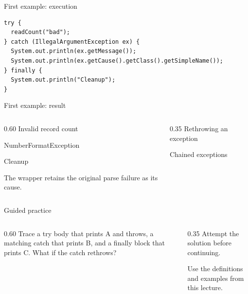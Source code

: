 \documentclass[10pt,aspectratio=169]{beamer}
\begin{document}
\begin{frame}[fragile,t]{First example: execution}
\begin{lstlisting}
try {
  readCount("bad");
} catch (IllegalArgumentException ex) {
  System.out.println(ex.getMessage());
  System.out.println(ex.getCause().getClass().getSimpleName());
} finally {
  System.out.println("Cleanup");
}
\end{lstlisting}
\end{frame}

\begin{frame}[fragile,t]{First example: result}
\begin{columns}[T,onlytextwidth]\begin{column}{0.60\textwidth}
Invalid record count\par NumberFormatException\par Cleanup\par The wrapper retains the original parse failure as its cause.
\end{column}\begin{column}{0.35\textwidth}\small
Rethrowing an exception

Chained exceptions
\end{column}\end{columns}
\end{frame}

\begin{frame}[fragile,t]{Guided practice}
\begin{columns}[T,onlytextwidth]\begin{column}{0.60\textwidth}
Trace a try body that prints A and throws, a matching catch that prints B, and a finally block that prints C. What if the catch rethrows?
\end{column}\begin{column}{0.35\textwidth}\small
Attempt the solution before continuing.

Use the definitions and examples from this lecture.
\end{column}\end{columns}
\end{frame}
\end{document}
